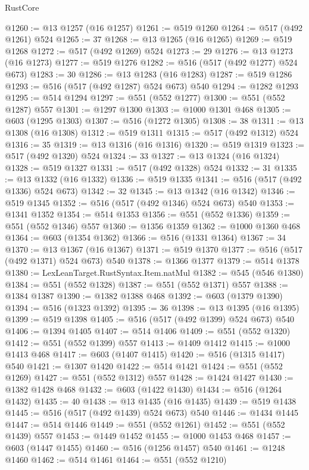 \begin{lexlean}{RustCore}
\begin{coremodule}
@1260 := @13 @1257 (@16 @1257)
@1261 := @519 @1260
@1264 := @517 (@492 @1261) @524
@1265 := 37
@1268 := @13 @1265 (@16 @1265)
@1269 := @519 @1268
@1272 := @517 (@492 @1269) @524
@1273 := 29
@1276 := @13 @1273 (@16 @1273)
@1277 := @519 @1276
@1282 := @516 (@517 (@492 @1277) @524 @673)
@1283 := 30
@1286 := @13 @1283 (@16 @1283)
@1287 := @519 @1286
@1293 := @516 (@517 (@492 @1287) @524 @673) @540
@1294 := @1282 @1293
@1295 := @514 @1294
@1297 := @551 (@552 @1277)
@1300 := @551 (@552 @1287) @557
@1301 := @1297 @1300
@1303 := @1000 @1301 @468
@1305 := @603 (@1295 @1303)
@1307 := @516 (@1272 @1305)
@1308 := 38
@1311 := @13 @1308 (@16 @1308)
@1312 := @519 @1311
@1315 := @517 (@492 @1312) @524
@1316 := 35
@1319 := @13 @1316 (@16 @1316)
@1320 := @519 @1319
@1323 := @517 (@492 @1320) @524
@1324 := 33
@1327 := @13 @1324 (@16 @1324)
@1328 := @519 @1327
@1331 := @517 (@492 @1328) @524
@1332 := 31
@1335 := @13 @1332 (@16 @1332)
@1336 := @519 @1335
@1341 := @516 (@517 (@492 @1336) @524 @673)
@1342 := 32
@1345 := @13 @1342 (@16 @1342)
@1346 := @519 @1345
@1352 := @516 (@517 (@492 @1346) @524 @673) @540
@1353 := @1341 @1352
@1354 := @514 @1353
@1356 := @551 (@552 @1336)
@1359 := @551 (@552 @1346) @557
@1360 := @1356 @1359
@1362 := @1000 @1360 @468
@1364 := @603 (@1354 @1362)
@1366 := @516 (@1331 @1364)
@1367 := 34
@1370 := @13 @1367 (@16 @1367)
@1371 := @519 @1370
@1377 := @516 (@517 (@492 @1371) @524 @673) @540
@1378 := @1366 @1377
@1379 := @514 @1378
@1380 := LexLeanTarget.RustSyntax.Item.natMul
@1382 := @545 (@546 @1380)
@1384 := @551 (@552 @1328)
@1387 := @551 (@552 @1371) @557
@1388 := @1384 @1387
@1390 := @1382 @1388 @468
@1392 := @603 (@1379 @1390)
@1394 := @516 (@1323 @1392)
@1395 := 36
@1398 := @13 @1395 (@16 @1395)
@1399 := @519 @1398
@1405 := @516 (@517 (@492 @1399) @524 @673) @540
@1406 := @1394 @1405
@1407 := @514 @1406
@1409 := @551 (@552 @1320)
@1412 := @551 (@552 @1399) @557
@1413 := @1409 @1412
@1415 := @1000 @1413 @468
@1417 := @603 (@1407 @1415)
@1420 := @516 (@1315 @1417) @540
@1421 := @1307 @1420
@1422 := @514 @1421
@1424 := @551 (@552 @1269)
@1427 := @551 (@552 @1312) @557
@1428 := @1424 @1427
@1430 := @1382 @1428 @468
@1432 := @603 (@1422 @1430)
@1434 := @516 (@1264 @1432)
@1435 := 40
@1438 := @13 @1435 (@16 @1435)
@1439 := @519 @1438
@1445 := @516 (@517 (@492 @1439) @524 @673) @540
@1446 := @1434 @1445
@1447 := @514 @1446
@1449 := @551 (@552 @1261)
@1452 := @551 (@552 @1439) @557
@1453 := @1449 @1452
@1455 := @1000 @1453 @468
@1457 := @603 (@1447 @1455)
@1460 := @516 (@1256 @1457) @540
@1461 := @1248 @1460
@1462 := @514 @1461
@1464 := @551 (@552 @1210)

\end{coremodule}
\end{lexlean}
